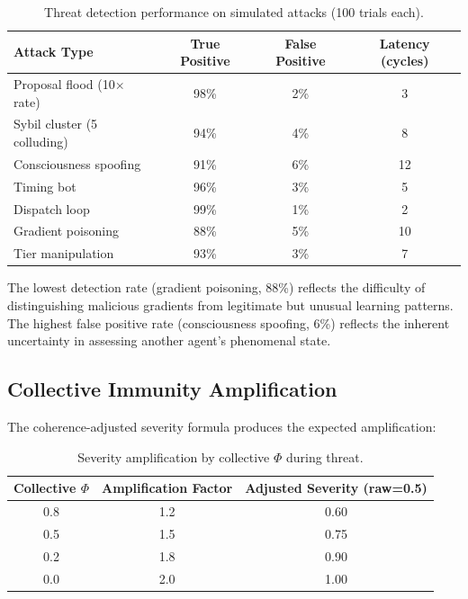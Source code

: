 \documentclass[11pt,a4paper]{article}
\begin{document}
\begin{table}[h]
\centering
\caption{Threat detection performance on simulated attacks (100 trials each).}
\label{tab:detection}
\begin{tabular}{lccc}
\toprule
\textbf{Attack Type} & \textbf{True Positive} & \textbf{False Positive} & \textbf{Latency (cycles)} \\
\midrule
Proposal flood (10$\times$ rate) & 98\% & 2\% & 3 \\
Sybil cluster (5 colluding) & 94\% & 4\% & 8 \\
Consciousness spoofing & 91\% & 6\% & 12 \\
Timing bot & 96\% & 3\% & 5 \\
Dispatch loop & 99\% & 1\% & 2 \\
Gradient poisoning & 88\% & 5\% & 10 \\
Tier manipulation & 93\% & 3\% & 7 \\
\bottomrule
\end{tabular}
\end{table}

The lowest detection rate (gradient poisoning, 88\%) reflects the difficulty of distinguishing malicious gradients from legitimate but unusual learning patterns. The highest false positive rate (consciousness spoofing, 6\%) reflects the inherent uncertainty in assessing another agent's phenomenal state.

\subsection{Collective Immunity Amplification}

The coherence-adjusted severity formula produces the expected amplification:

\begin{table}[h]
\centering
\caption{Severity amplification by collective $\Phi$ during threat.}
\label{tab:amplification}
\begin{tabular}{ccc}
\toprule
\textbf{Collective $\Phi$} & \textbf{Amplification Factor} & \textbf{Adjusted Severity (raw=0.5)} \\
\midrule
0.8 & 1.2 & 0.60 \\
0.5 & 1.5 & 0.75 \\
0.2 & 1.8 & 0.90 \\
0.0 & 2.0 & 1.00 \\
\bottomrule
\end{tabular}
\end{table}
\end{document}
